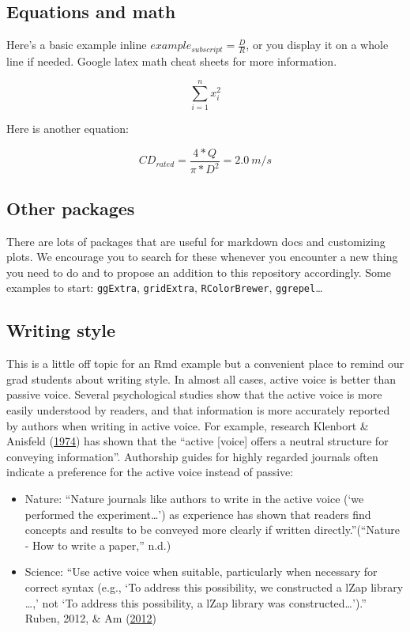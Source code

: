 \documentclass[]{elsarticle} %
\providecommand{\tightlist}{%
  \setlength{\itemsep}{0pt}\setlength{\parskip}{0pt}}
\begin{document}
\subsection{Equations and math}\label{equations-and-math}

Here's a basic example inline \(example_{subscript} = \frac{D}{R}\), or
you display it on a whole line if needed. Google latex math cheat sheets
for more information.

\[\sum_{i=1}^{n}{x_i^2}\]

Here is another equation:

\[ CD_{rated} = \frac{4*Q}{\pi*D^2} = 2.0~m/s\]

\subsection{Other packages}\label{other-packages}

There are lots of packages that are useful for markdown docs and
customizing plots. We encourage you to search for these whenever you
encounter a new thing you need to do and to propose an addition to this
repository accordingly. Some examples to start: \texttt{ggExtra},
\texttt{gridExtra}, \texttt{RColorBrewer}, \texttt{ggrepel}\ldots{}

\subsection{Writing style}\label{writing-style}

This is a little off topic for an Rmd example but a convenient place to
remind our grad students about writing style. In almost all cases,
active voice is better than passive voice. Several psychological studies
show that the active voice is more easily understood by readers, and
that information is more accurately reported by authors when writing in
active voice. For example, research Klenbort \& Anisfeld
(\protect\hyperlink{ref-klenbortMarkednessPerspectiveInterpretation1974}{1974})
has shown that the ``active {[}voice{]} offers a neutral structure for
conveying information''. Authorship guides for highly regarded journals
often indicate a preference for the active voice instead of passive:

\begin{itemize}
\tightlist
\item
  Nature: ``Nature journals like authors to write in the active voice
  (`we performed the experiment\ldots{}') as experience has shown that
  readers find concepts and results to be conveyed more clearly if
  written directly.''(``Nature - How to write a paper,'' n.d.)
\item
  Science: ``Use active voice when suitable, particularly when necessary
  for correct syntax (e.g., `To address this possibility, we constructed
  a lZap library \ldots{},' not `To address this possibility, a lZap
  library was constructed\ldots{}').'' Ruben, 2012, \& Am
  (\protect\hyperlink{ref-rubenHowWriteScientist2012}{2012})
\end{itemize}
\end{document}
